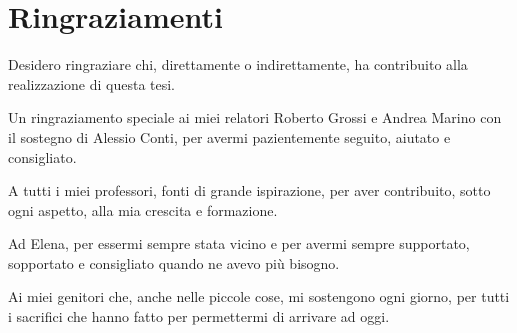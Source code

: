 

\chapter*{Ringraziamenti}


Desidero ringraziare chi, direttamente o indirettamente, ha contribuito alla realizzazione di questa tesi.\medskip

Un ringraziamento speciale ai miei relatori Roberto Grossi e Andrea Marino con il sostegno di Alessio Conti, per avermi pazientemente seguito, aiutato e consigliato.\medskip

A tutti i miei professori, fonti di grande ispirazione, per aver contribuito, sotto ogni aspetto, alla mia crescita e formazione.\medskip

Ad Elena, per essermi sempre stata vicino e per avermi sempre supportato, sopportato e consigliato quando ne avevo più bisogno.\medskip

Ai miei genitori che, anche nelle piccole cose, mi sostengono ogni giorno, per tutti i sacrifici che hanno fatto per permettermi di arrivare ad oggi.\medskip

\noindent

\clearpage